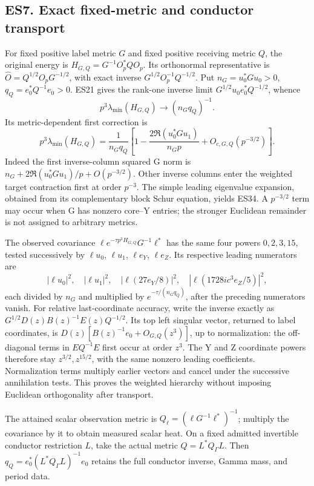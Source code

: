 \subsection{ES7. Exact fixed-metric and conductor transport}\label{es7.-exact-fixed-metric-and-conductor-transport}

For fixed positive label metric \(G\) and fixed positive receiving metric \(Q\), the original energy is \(H_{G,Q}=G^{-1}O_p^*QO_p\). Its orthonormal representative is \(\widehat O=Q^{1/2}O_pG^{-1/2}\), with exact inverse \(G^{1/2}O_p^{-1}Q^{-1/2}\). Put \(n_G=u_0^*Gu_0>0\), \(q_Q=e_0^*Q^{-1}e_0>0\). ES21 gives the rank-one inverse limit \(G^{1/2}u_0e_0^*Q^{-1/2}\), whence \[
p^3\lambda_{\min}(H_{G,Q})\longrightarrow(n_Gq_Q)^{-1}.
\tag{ES33}
\] Its metric-dependent first correction is \[
\boxed{p^3\lambda_{\min}(H_{G,Q})
=\frac1{n_Gq_Q}\left[1-\frac{2\Re(u_0^*Gu_1)}{n_Gp}+O_{c,G,Q}(p^{-3/2})\right].}
\tag{ES34}
\] Indeed the first inverse-column squared G norm is \(n_G+2\Re(u_0^*Gu_1)/p+O(p^{-3/2})\). Other inverse columns enter the weighted target contraction first at order \(p^{-3}\). The simple leading eigenvalue expansion, obtained from its complementary block Schur equation, yields ES34. A \(p^{-3/2}\) term may occur when G has nonzero core--Y entries; the stronger Euclidean remainder is not assigned to arbitrary metrics.

The observed covariance \(\ell e^{-\tau p^3H_{G,Q}}G^{-1}\ell^*\) has the same four powers \(0,2,3,15\), tested successively by \(\ell u_0\), \(\ell u_1\), \(\ell e_Y\), \(\ell e_Z\). Its respective leading numerators are \[
|\ell u_0|^2,\quad |\ell u_1|^2,\quad |\ell(27e_Y/8)|^2,
\quad |\ell(1728ic^3e_Z/5)|^2,
\tag{ES35}
\] each divided by \(n_G\) and multiplied by \(e^{-\tau/(n_Gq_Q)}\), after the preceding numerators vanish. For relative last-coordinate accuracy, write the inverse exactly as \(G^{1/2}D(z)B(z)^{-1}E(z)Q^{-1/2}\). Its top left singular vector, returned to label coordinates, is \(D(z)[B(z)^{-1}e_0+O_{G,Q}(z^3)]\), up to normalization: the off-diagonal terms in \(E Q^{-1}E\) first occur at order \(z^3\). The Y and Z coordinate powers therefore stay \(z^{3/2},z^{15/2}\), with the same nonzero leading coefficients. Normalization terms multiply earlier vectors and cancel under the successive annihilation tests. This proves the weighted hierarchy without imposing Euclidean orthogonality after transport.

The attained scalar observation metric is \(Q_\ell=(\ell G^{-1}\ell^*)^{-1}\); multiply the covariance by it to obtain measured scalar heat. On a fixed admitted invertible conductor restriction \(L\), take the actual metric \(Q=L^*Q_\Gamma L\). Then \(q_Q=e_0^*(L^*Q_\Gamma L)^{-1}e_0\) retains the full conductor inverse, Gamma mass, and period data.

